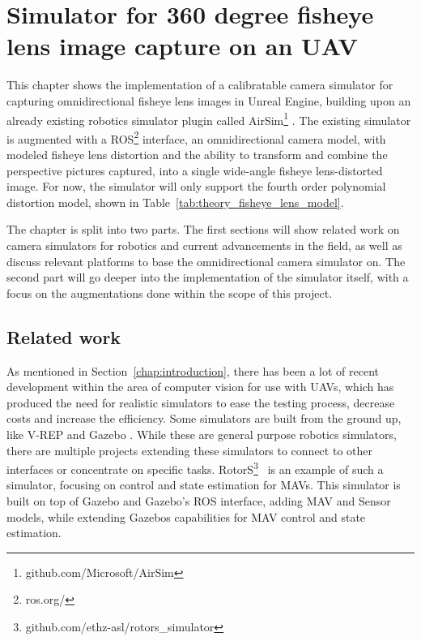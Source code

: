 
\chapter{Simulator for 360 degree fisheye lens image capture on an UAV} \label{chap:simulator}

This chapter shows the implementation of a calibratable camera simulator for capturing omnidirectional fisheye lens images in Unreal Engine, building upon an already existing robotics simulator plugin called AirSim\footnote{github.com/Microsoft/AirSim} \cite{Airsim_paper}. The existing simulator is augmented with a ROS\footnote{ros.org/} interface, an omnidirectional camera model, with modeled fisheye lens distortion and the ability to transform and combine the perspective pictures captured, into a single wide-angle fisheye lens-distorted image. For now, the simulator will only support the fourth order polynomial distortion model, shown in Table~\ref{tab:theory_fisheye_lens_model}.

The chapter is split into two parts. The first sections will show related work on camera simulators for robotics and current advancements in the field, as well as discuss relevant platforms to base the omnidirectional camera simulator on. The second part will go deeper into the implementation of the simulator itself, with a focus on the augmentations done within the scope of this project.

\section{Related work} \label{sec:simulator_related}

As mentioned in Section~\ref{chap:introduction}, there has been a lot of recent development within the area of computer vision for use with UAVs, which has produced the need for realistic simulators to ease the testing process, decrease costs and increase the efficiency. Some simulators are built from the ground up, like V-REP \cite{VREP2013} and Gazebo \cite{GazeboPaper}. While these are general purpose robotics simulators, there are multiple projects extending these simulators to connect to other interfaces or concentrate on specific tasks. RotorS\footnote{github.com/ethz-asl/rotors\_simulator}~\cite{RotorS} is an example of such a simulator, focusing on control and state estimation for MAVs. This simulator is built on top of Gazebo and Gazebo's ROS interface, adding MAV and Sensor models, while extending Gazebos capabilities for MAV control and state estimation.

